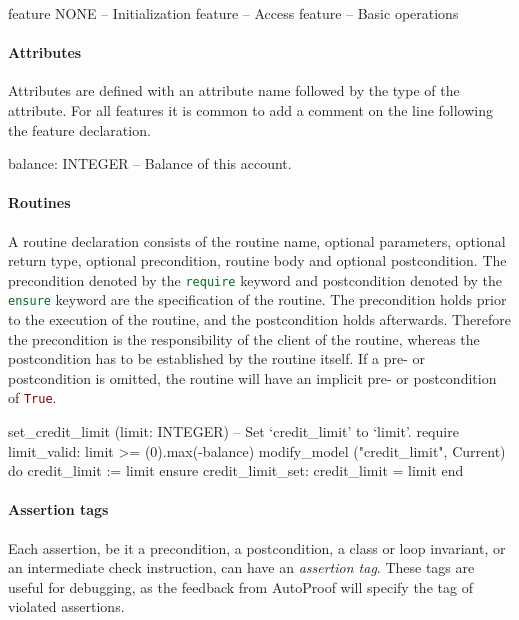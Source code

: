 \documentclass[a4paper,12pt]{article}
\newcommand{\AutoProof}{Auto\-Proof\xspace}
\newcommand{\e}[1]{\mbox{\lstinline[language=Eiffel]|#1|}}
\begin{document}
\begin{erunning}
feature {NONE} -- Initialization
feature -- Access
feature -- Basic operations
\end{erunning}

\paragraph{Attributes}

Attributes are defined with an attribute name followed by the type of the attribute. For all features it is common to add a comment on the line following the feature declaration.

\begin{erunning}
	balance: INTEGER
		-- Balance of this account.
\end{erunning}

\paragraph{Routines}

A routine declaration consists of the routine name, optional parameters, optional return type, optional precondition, routine body and optional postcondition. The precondition denoted by the \e{require} keyword and postcondition denoted by the \e{ensure} keyword are the specification of the routine. The precondition holds prior to the execution of the routine, and the postcondition holds afterwards. Therefore the precondition is the responsibility of the client of the routine, whereas the postcondition has to be established by the routine itself. If a pre- or postcondition is omitted, the routine will have an implicit pre- or postcondition of \e{True}.

\begin{erunning}
	set_credit_limit (limit: INTEGER)
			-- Set `credit_limit' to `limit'.
		require
			limit_valid: limit >= (0).max(-balance)
			modify_model ("credit_limit", Current)
		do
			credit_limit := limit
		ensure
			credit_limit_set: credit_limit = limit
		end
\end{erunning}

\paragraph{Assertion tags}

Each assertion, be it a precondition, a postcondition, a class or loop invariant, or an intermediate check instruction, can have an \emph{assertion tag}. These tags are useful for debugging, as the feedback from \AutoProof will specify the tag of violated assertions.
\end{document}
